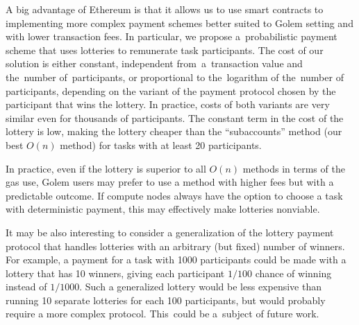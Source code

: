 \documentclass[a4paper]{article}
\begin{document}
    A big advantage of Ethereum is that it allows us to use smart contracts to implementing more complex
    payment schemes better suited to Golem setting and with lower transaction fees. 
    In particular, we propose a~probabilistic payment scheme that uses lotteries to remunerate task participants.
    The cost of our solution is either constant, independent from~a~transaction value and the~number of~participants,
    or proportional to the~logarithm of the~number of participants, depending on the variant of the payment protocol
    chosen by the participant that wins the lottery. In practice, costs of both variants are very similar even
    for thousands of participants. The constant term in the cost of the lottery is low, making the lottery cheaper
    than the ``subaccounts'' method (our best $O(n)$ method) for tasks with at least 20 participants.

    In practice, even if the lottery is superior to all $O(n)$ methods in terms of the gas use, Golem users
    may prefer to use a method with higher fees but with a predictable outcome. If compute nodes always have
    the option to choose a task with deterministic payment, this may effectively make lotteries nonviable.

    It may be also interesting to consider a generalization of the lottery payment protocol that handles
    lotteries with an arbitrary (but fixed) number of winners. For example, a payment for a task with 1000
    participants could be made with a lottery that has 10 winners, giving each participant $1 / 100$ chance
    of winning instead of $1 / 1000$. Such a generalized lottery would be less expensive than running 10
    separate lotteries for each 100 participants, but would probably require a more complex protocol. This~could
    be a~subject of future work.
    
\end{document}
